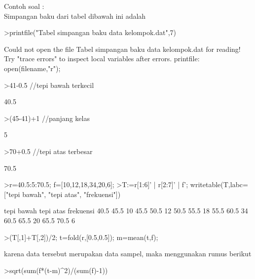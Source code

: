\documentclass[a4paper,10pt]{article}
\begin{document}
\begin{eulernotebook}
\begin{eulercomment}
\begin{eulercomment}
\begin{eulercomment}
\begin{eulercomment}
\begin{eulercomment}
\begin{eulercomment}
\begin{eulercomment}
\begin{eulercomment}
\begin{eulercomment}
\begin{eulercomment}
\begin{eulercomment}
\begin{eulercomment}
\begin{eulercomment}
\begin{eulercomment}
\begin{eulercomment}
Contoh soal :\\
Simpangan baku dari tabel dibawah ini adalah
\end{eulercomment}
\begin{eulerprompt}
>printfile("Tabel simpangan baku data kelompok.dat",7)
\end{eulerprompt}
\begin{euleroutput}
  Could not open the file
  Tabel simpangan baku data kelompok.dat
  for reading!
  Try "trace errors" to inspect local variables after errors.
  printfile:
      open(filename,"r");
\end{euleroutput}
\begin{eulerprompt}
>41-0.5 //tepi bawah terkecil
\end{eulerprompt}
\begin{euleroutput}
  40.5
\end{euleroutput}
\begin{eulerprompt}
>(45-41)+1 //panjang kelas
\end{eulerprompt}
\begin{euleroutput}
  5
\end{euleroutput}
\begin{eulerprompt}
>70+0.5 //tepi atas terbesar
\end{eulerprompt}
\begin{euleroutput}
  70.5
\end{euleroutput}
\begin{eulerprompt}
>r=40.5:5:70.5; f=[10,12,18,34,20,6];
>T:=r[1:6]' | r[2:7]' | f'; writetable(T,labc=["tepi bawah", "tepi atas", "frekuensi"])
\end{eulerprompt}
\begin{euleroutput}
   tepi bawah tepi atas frekuensi
         40.5      45.5        10
         45.5      50.5        12
         50.5      55.5        18
         55.5      60.5        34
         60.5      65.5        20
         65.5      70.5         6
\end{euleroutput}
\begin{eulerprompt}
>(T[,1]+T[,2])/2; t=fold(r,[0.5,0.5]); m=mean(t,f);
\end{eulerprompt}
\begin{eulercomment}
karena data tersebut merupakan data sampel, maka menggunakan rumus
berikut
\end{eulercomment}
\begin{eulerprompt}
>sqrt(sum(f*(t-m)^2)/(sum(f)-1))
\end{eulerprompt}
\begin{euleroutput}

\end{euleroutput}
\end{eulercomment}
\end{eulercomment}
\end{eulercomment}
\end{eulercomment}
\end{eulercomment}
\end{eulercomment}
\end{eulercomment}
\end{eulercomment}
\end{eulercomment}
\end{eulercomment}
\end{eulercomment}
\end{eulercomment}
\end{eulercomment}
\end{eulercomment}
\end{eulernotebook}
\end{document}
